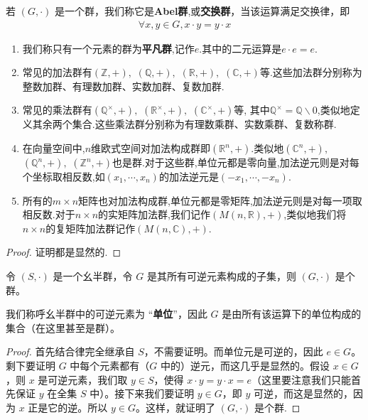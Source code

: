 \documentclass[../../main.tex]{subfiles}
\begin{document}
\begin{definition}[Abel群]
若 $(G, \cdot)$ 是一个群，我们称它是\textbf{Abel群},或\textbf{交换群}，当该运算满足交换律，即
\begin{align*}
\forall x, y \in G, x \cdot y = y \cdot x
\end{align*} 
\end{definition}

\begin{example}[$\,\,$常见的群]
\begin{enumerate}
\item 我们称只有一个元素的群为\textbf{平凡群},记作${e}$.其中的二元运算是$e\cdot e=e$.
\item 常见的加法群有$(\mathbb{Z},+),$ $(\mathbb{Q},+),$ $(\mathbb{R},+),$ $(\mathbb{C},+)$等.这些加法群分别称为整数加群、有理数加群、实数加群、复数加群.
\item 常见的乘法群有$(\mathbb{Q}^\times,+),$ $(\mathbb{R}^\times,+),$ $(\mathbb{C}^\times,+)$等, 其中$\mathbb{Q}^\times=\mathbb{Q}\backslash {0}$,类似地定义其余两个集合.这些乘法群分别称为有理数乘群、实数乘群、复数称群.
\item 在向量空间中,$n$维欧式空间对加法构成群即$(\mathbb{R}^n,+)$.类似地$(\mathbb{C}^n,+),$ $(\mathbb{Q}^n,+),$ $(\mathbb{Z}^n,+)$也是群.对于这些群,单位元都是零向量,加法逆元则是对每个坐标取相反数,如$(x_1,\cdots,x_n)$的加法逆元是$(-x_1,\cdots,-x_n)$.
\item 所有的$m\times n$矩阵也对加法构成群,单位元都是零矩阵,加法逆元则是对每一项取相反数.对于$n\times n$的实矩阵加法群,我们记作$(M(n,\mathbb{R}),+)$,类似地我们将$n\times n$的复矩阵加法群记作$(M(n,\mathbb{C}),+)$.
\end{enumerate}
\end{example}
\begin{proof}
证明都是显然的.
\end{proof}

\begin{lemma}
令 $(S, \cdot)$ 是一个幺半群，令 $G$ 是其所有可逆元素构成的子集，则 $(G, \cdot)$ 是个群。
\end{lemma}
\begin{remark}
我们称呼幺半群中的可逆元素为 “\textbf{单位}”，因此 $G$ 是由所有该运算下的单位构成的集合（在这里甚至是群）。
\end{remark}
\begin{proof}
首先结合律完全继承自 $S$，不需要证明。而单位元是可逆的，因此 $e \in G$。剩下要证明 $G$ 中每个元素都有（$G$ 中的）逆元，而这几乎是显然的。假设 $x \in G$，则 $x$ 是可逆元素，我们取 $y \in S$，使得 $x \cdot y = y \cdot x = e$（这里要注意我们只能首先保证 $y$ 在全集 $S$ 中）。接下来我们要证明 $y \in G$，即 $y$ 可逆，而这是显然的，因为 $x$ 正是它的逆。所以 $y \in G$。这样，就证明了 $(G, \cdot)$ 是个群.
\end{proof}
\end{document}
